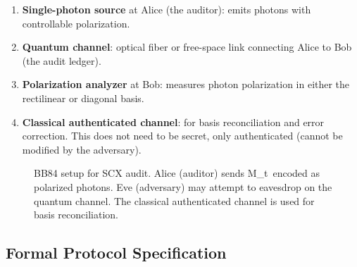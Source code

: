 \documentclass[11pt,a4paper]{article}
\theoremstyle{plain}
\theoremstyle{definition}
\theoremstyle{remark}
\newcommand{\Mt}{M_t}
\begin{document}
\begin{enumerate}[label=(\arabic*)]
  \item \textbf{Single-photon source} at Alice (the auditor): emits photons
        with controllable polarization.
  \item \textbf{Quantum channel}: optical fiber or free-space link connecting
        Alice to Bob (the audit ledger).
  \item \textbf{Polarization analyzer} at Bob: measures photon polarization
        in either the rectilinear or diagonal basis.
  \item \textbf{Classical authenticated channel}: for basis reconciliation
        and error correction. This does not need to be secret, only
        authenticated (cannot be modified by the adversary).
\end{enumerate}

\begin{figure}[H]
\centering
{}
\caption{BB84 setup for SCX audit. Alice (auditor) sends \Mt\ encoded as
polarized photons. Eve (adversary) may attempt to eavesdrop on the quantum
channel. The classical authenticated channel is used for basis reconciliation.}
\label{fig:bb84_setup}
\end{figure}

\subsection{Formal Protocol Specification}
\label{sec:bb84_formal}
\end{document}
